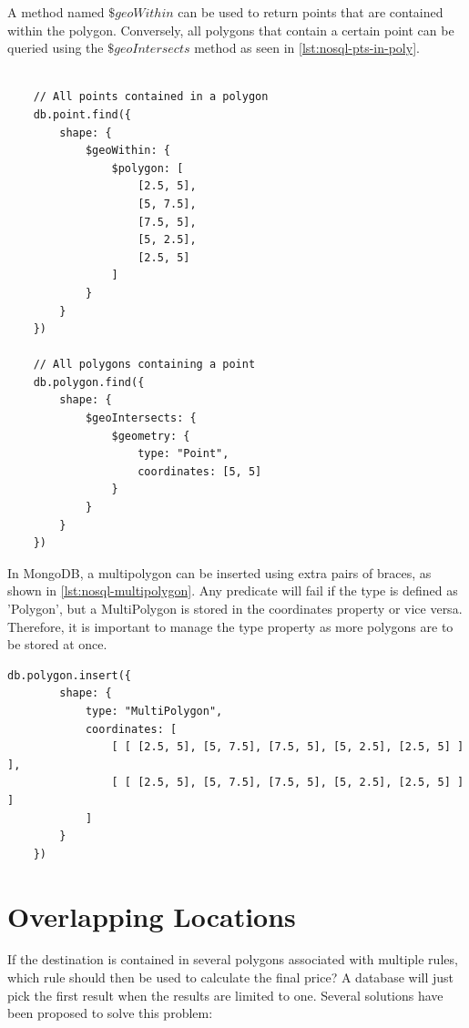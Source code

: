 A method named $\$geoWithin$ can be used to return points that are contained within the polygon. Conversely, all polygons that contain a certain point can be queried using the $\$geoIntersects$ method as seen in \ref{lst:nosql-pts-in-poly}.

\begin{center}
\noindent\begin{minipage}{.85\textwidth}
\begin{lstlisting}[caption={Select points contained in polygon, and all polygons containing a point in MongoDB.}, label={lst:nosql-pts-in-poly}]

	// All points contained in a polygon
	db.point.find({
		shape: {
			$geoWithin: {
				$polygon: [
					[2.5, 5],
					[5, 7.5],
					[7.5, 5],
					[5, 2.5],
					[2.5, 5]
				]
			}
		}
	})

	// All polygons containing a point
	db.polygon.find({
		shape: {
			$geoIntersects: {
				$geometry: {
					type: "Point",
					coordinates: [5, 5]
				}
			}
		}
	})
\end{lstlisting}
\end{minipage}
\end{center}

In MongoDB, a multipolygon can be inserted using extra pairs of braces, as shown in \ref{lst:nosql-multipolygon}. Any predicate will fail if the type is defined as 'Polygon', but a MultiPolygon is stored in the coordinates property or vice versa. Therefore, it is important to manage the type property as more polygons are to be stored at once.

\begin{center}
\noindent\begin{minipage}{.85\textwidth}
\begin{lstlisting}[caption={Insert one multipolygon in MongoDB.}, label={lst:nosql-multipolygon}]
	db.polygon.insert({
		shape: {
			type: "MultiPolygon",
			coordinates: [
				[ [ [2.5, 5], [5, 7.5], [7.5, 5], [5, 2.5], [2.5, 5] ] ],
				[ [ [2.5, 5], [5, 7.5], [7.5, 5], [5, 2.5], [2.5, 5] ] ]
			]
		}
	})
\end{lstlisting}
\end{minipage}
\end{center}

\section{Overlapping Locations}
If the destination is contained in several polygons associated with multiple rules, which rule should then be used to calculate the final price? A database will just pick the first result when the results are limited to one. Several solutions have been proposed to solve this problem:

